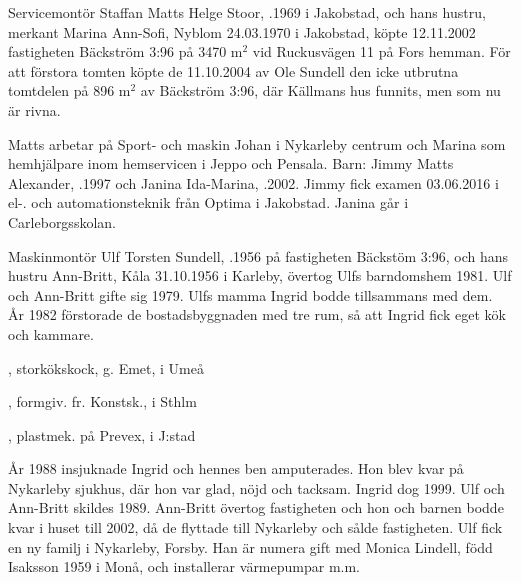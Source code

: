 %
Servicemontör Staffan Matts Helge Stoor, .1969 i Jakobstad,	och hans hustru, merkant  Marina Ann-Sofi, \textborn Nyblom 24.03.1970 i Jakobstad, köpte 12.11.2002 fastigheten Bäckström 3:96 på 3470	m$^2$  vid Ruckusvägen 11 på Fors hemman. För att förstora tomten köpte de 11.10.2004 av Ole Sundell den icke utbrutna tomtdelen på 896 m$^2$ av Bäckström 3:96, där Källmans hus funnits, men som nu är rivna.

Matts arbetar på Sport- och maskin Johan i Nykarleby centrum och 	Marina som hemhjälpare inom hemservicen i Jeppo och Pensala.	Barn:	Jimmy Matts Alexander, .1997	och Janina Ida-Marina,	.2002.	Jimmy fick examen 03.06.2016 i el-. och automationsteknik från 	Optima i Jakobstad. Janina går i Carleborgsskolan.


%
Maskinmontör Ulf Torsten Sundell, .1956 på fastigheten Bäckstöm 3:96, och hans hustru Ann-Britt, \textborn Kåla 31.10.1956 i Karleby, övertog Ulfs barndomshem 1981. Ulf och Ann-Britt gifte sig 1979. Ulfs mamma Ingrid bodde tillsammans med dem. År 1982 förstorade de bostadsbyggnaden med tre rum, så att Ingrid fick eget kök och kammare.
\begin{jhchildren}
  \item {}, storkökskock, g. Emet, i Umeå
  \item {}, formgiv. fr. Konstsk., i Sthlm
  \item {}, plastmek. på Prevex, i J:stad
\end{jhchildren}

År 1988 insjuknade Ingrid och hennes ben amputerades. Hon blev kvar på Nykarleby sjukhus, där hon var glad, nöjd och tacksam. Ingrid dog 	1999. Ulf och Ann-Britt skildes 1989. Ann-Britt övertog fastigheten och	hon och barnen bodde kvar i huset till 2002, då de flyttade till Nykarleby och sålde fastigheten. Ulf fick en ny familj i Nykarleby, Forsby. Han är numera gift med Monica Lindell, född Isaksson 1959 i Monå, och installerar värmepumpar m.m.


%
\jhvspace{}


